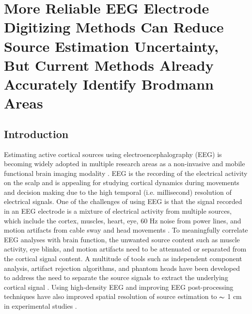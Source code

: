 \documentclass[../thesis_seyed.tex]{subfiles}
\begin{document}
\chapter{More Reliable EEG Electrode Digitizing Methods Can Reduce Source Estimation Uncertainty, But Current Methods Already Accurately Identify Brodmann Areas}
\section{Introduction}

Estimating active cortical sources using electroencephalography (EEG) is becoming widely adopted in multiple research areas as a non-invasive and mobile functional brain imaging modality  \cite{Tsolaki2017-nt,Bradley2016-wg,Landsness2011-mr,Nystrom2008-ex}. EEG is the recording of the electrical activity on the scalp and is appealing for studying cortical dynamics during movements and decision making due to the high temporal (i.e. millisecond) resolution of electrical signals. One of the challenges of using EEG is that the signal recorded in an EEG electrode is a mixture of electrical activity from multiple sources, which include the cortex, muscles, heart, eye, 60 Hz noise from power lines, and motion artifacts from cable sway and head movements \cite{Kline2015-mf,Symeonidou2018-ge}. To meaningfully correlate EEG analyses with brain function, the unwanted source content such as muscle activity, eye blinks, and motion artifacts need to be attenuated or separated from the cortical signal content. A multitude of tools such as independent component analysis, artifact rejection algorithms, and phantom heads have been developed to address the need to separate the source signals to extract the underlying cortical signal \cite{Delorme2012-re,Mullen2013-xv,Artoni2014-jy,Oliveira2016-hy,Nordin2018-aq}. Using high-density EEG and improving EEG post-processing techniques have also improved spatial resolution of source estimation to $\thicksim$ 1 cm in experimental studies \cite{Seeber2019-dn,Hedrich2017-of,Klamer2015-yp,Scarff2004-ll,Lantz2003-om,He1989-dw}.
\end{document}

